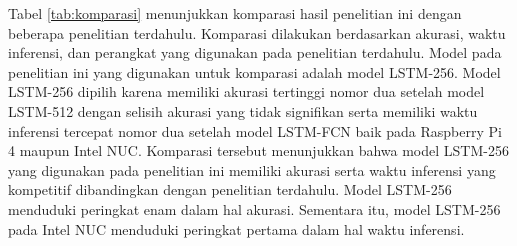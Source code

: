 Tabel \ref{tab:komparasi} menunjukkan komparasi hasil penelitian ini dengan beberapa penelitian terdahulu.
Komparasi dilakukan berdasarkan akurasi, waktu inferensi, dan perangkat yang digunakan pada penelitian terdahulu.
Model pada penelitian ini yang digunakan untuk komparasi adalah model LSTM-256.
Model LSTM-256 dipilih karena memiliki akurasi tertinggi nomor dua setelah model LSTM-512 dengan selisih akurasi yang tidak signifikan serta memiliki waktu inferensi tercepat nomor dua setelah model LSTM-FCN baik pada Raspberry Pi 4 maupun Intel NUC.
Komparasi tersebut menunjukkan bahwa model LSTM-256 yang digunakan pada penelitian ini memiliki akurasi serta waktu inferensi yang kompetitif dibandingkan dengan penelitian terdahulu.
Model LSTM-256 menduduki peringkat enam dalam hal akurasi.
Sementara itu, model LSTM-256 pada Intel NUC menduduki peringkat pertama dalam hal waktu inferensi.

